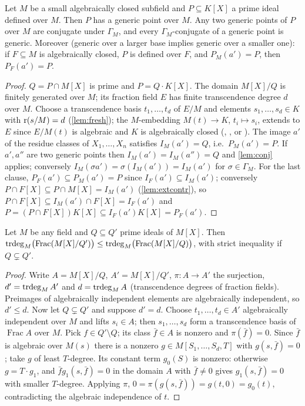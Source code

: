 \begin{lemma}\label{lem:genexists}
Let $M$ be a small algebraically closed subfield and $P\subseteq K[X]$ a prime ideal
defined over $M$.  Then $P$ has a generic point over $M$.  Any two generic points of
$P$ over $M$ are conjugate under $\Gamma_M$, and every $\Gamma_M$-conjugate of a generic
point is generic.  Moreover (generic over a larger base implies generic over a smaller
one): if $F\subseteq M$ is algebraically closed, $P$ is defined over $F$, and
$P_M(a')=P$, then $P_F(a')=P$.
\end{lemma}
\begin{proof}
$Q=P\cap M[X]$ is prime and $P=Q\cdot K[X]$.  The domain $M[X]/Q$ is finitely
generated over $M$; its fraction field $E$ has finite transcendence degree $d$ over $M$.
Choose a transcendence basis $t_1,\dots,t_d$ of $E/M$ and elements $s_1,\dots,s_d\in K$
with $\operatorname{r}(s/M)=d$ (\cref{lem:fresh}); the $M$-embedding $M(t)\to K$, $t_i\mapsto s_i$,
extends to $E$ since $E/M(t)$ is algebraic and $K$ is algebraically closed
(,
, or ).  The image
$a'$ of the residue classes of $X_1,\dots,X_n$ satisfies $I_M(a')=Q$, i.e.\ $P_M(a')=P$.
If $a',a''$ are two generic points then $I_M(a')=I_M(a'')=Q$ and \cref{lem:conj} applies;
conversely $I_M(\sigma a')=\sigma(I_M(a'))=I_M(a')$ for $\sigma\in\Gamma_M$.
For the last clause, $P_F(a')\subseteq P_M(a')=P$ since $I_F(a')\subseteq I_M(a')$;
conversely $P\cap F[X]\subseteq P\cap M[X]=I_M(a')$ (\cref{lem:extcontr}), so
$P\cap F[X]\subseteq I_M(a')\cap F[X]=I_F(a')$ and
$P=(P\cap F[X])K[X]\subseteq I_F(a')K[X]=P_F(a')$.
\end{proof}

\begin{lemma}\label{lem:dimdrop}
Let $M$ be any field and $Q\subseteq Q'$ prime ideals of $M[X]$.  Then
$\operatorname{trdeg}_M\bigl(\operatorname{Frac}(M[X]/Q')\bigr)\le\operatorname{trdeg}_M\bigl(\operatorname{Frac}(M[X]/Q)\bigr)$,
with strict inequality if $Q\subsetneq Q'$.
\end{lemma}
\begin{proof}
Write $A=M[X]/Q$, $A'=M[X]/Q'$, $\pi:A\to A'$ the surjection, $d'=\operatorname{trdeg}_M A'$ and
$d=\operatorname{trdeg}_M A$ (transcendence degrees of fraction fields).  Preimages of algebraically
independent elements are algebraically independent, so $d'\le d$.  Now let
$Q\subsetneq Q'$ and suppose $d'=d$.
Choose $t_1,\dots,t_d\in A'$ algebraically independent over $M$ and lifts $s_i\in A$;
then $s_1,\dots,s_d$ form a transcendence basis of $\operatorname{Frac}A$ over $M$.
Pick $f\in Q'\setminus Q$; its class $\bar f\in A$ is nonzero and $\pi(\bar f)=0$.
Since $\bar f$ is algebraic over $M(s)$ there is a nonzero $g\in M[S_1,\dots,S_d,T]$
with $g(s,\bar f)=0$; take $g$ of least $T$-degree.  Its constant term $g_0(S)$ is
nonzero: otherwise $g=T\cdot g_1$, and $\bar f g_1(s,\bar f)=0$ in the domain $A$ with
$\bar f\ne 0$ gives $g_1(s,\bar f)=0$ with smaller $T$-degree.  Applying $\pi$,
$0=\pi(g(s,\bar f))=g(t,0)=g_0(t)$, contradicting the algebraic independence of $t$.
\end{proof}

